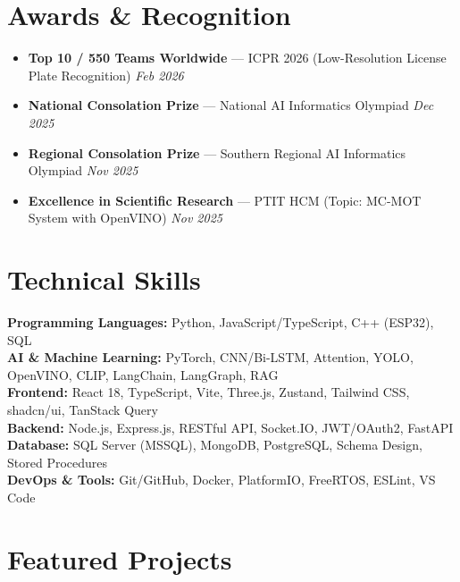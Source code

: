 \documentclass[10pt, a4paper]{article}
\begin{document}
\section{Awards \& Recognition}
\begin{itemize}[leftmargin=0em, label={}, itemsep=3pt]
    \item \textbf{Top 10 / 550 Teams Worldwide} --- ICPR 2026 (Low-Resolution License Plate Recognition) \hfill \textit{\footnotesize Feb 2026}
    \item \textbf{National Consolation Prize} --- National AI Informatics Olympiad \hfill \textit{\footnotesize Dec 2025}
    \item \textbf{Regional Consolation Prize} --- Southern Regional AI Informatics Olympiad \hfill \textit{\footnotesize Nov 2025}
    \item \textbf{Excellence in Scientific Research} --- PTIT HCM (Topic: MC-MOT System with OpenVINO) \hfill \textit{\footnotesize Nov 2025}
\end{itemize}

\section{Technical Skills}
\begin{itemize}[leftmargin=0em, label={}]
    \small{\item{
     \textbf{Programming Languages:} Python, JavaScript/TypeScript, C++ (ESP32), SQL \\
     \textbf{AI \& Machine Learning:} PyTorch, CNN/Bi-LSTM, Attention, YOLO, OpenVINO, CLIP, LangChain, LangGraph, RAG \\
     \textbf{Frontend:} React 18, TypeScript, Vite, Three.js, Zustand, Tailwind CSS, shadcn/ui, TanStack Query \\
     \textbf{Backend:} Node.js, Express.js, RESTful API, Socket.IO, JWT/OAuth2, FastAPI \\
     \textbf{Database:} SQL Server (MSSQL), MongoDB, PostgreSQL, Schema Design, Stored Procedures \\
     \textbf{DevOps \& Tools:} Git/GitHub, Docker, PlatformIO, FreeRTOS, ESLint, VS Code
    }}
\end{itemize}

\section{Featured Projects}
\end{document}
